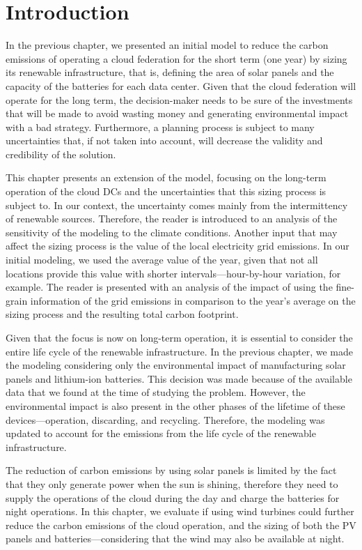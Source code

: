 \section{Introduction}

In the previous chapter, we presented an initial model to reduce the carbon emissions of operating a cloud federation for the short term (one year) by sizing its renewable infrastructure, that is, defining the area of solar panels and the capacity of the batteries for each data center. Given that the cloud federation will operate for the long term, the decision-maker needs to be sure of the investments that will be made to avoid wasting money and generating environmental impact with a bad strategy. Furthermore, a planning process is subject to many uncertainties that, if not taken into account, will decrease the validity and credibility of the solution.

This chapter presents an extension of the model, focusing on the long-term operation of the cloud DCs and the uncertainties that this sizing process is subject to. In our context, the uncertainty comes mainly from the intermittency of renewable sources. Therefore, the reader is introduced to an analysis of the sensitivity of the modeling to the climate conditions. Another input that may affect the sizing process is the value of the local electricity grid emissions. In our initial modeling, we used the average value of the year, given that not all locations provide this value with shorter intervals---hour-by-hour variation, for example. The reader is presented with an analysis of the impact of using the fine-grain information of the grid emissions in comparison to the year's average on the sizing process and the resulting total carbon footprint.

Given that the focus is now on long-term operation, it is essential to consider the entire life cycle of the renewable infrastructure. In the previous chapter, we made the modeling considering only the environmental impact of manufacturing solar panels and lithium-ion batteries. This decision was made because of the available data that we found at the time of studying the problem. However, the environmental impact is also present in the other phases of the lifetime of these devices---operation, discarding, and recycling. Therefore, the modeling was updated to account for the emissions from the life cycle of the renewable infrastructure.

The reduction of carbon emissions by using solar panels is limited by the fact that they only generate power when the sun is shining, therefore they need to supply the operations of the cloud during the day and charge the batteries for night operations. In this chapter, we evaluate if using wind turbines could further reduce the carbon emissions of the cloud operation, and the sizing of both the PV panels and batteries---considering that the wind may also be available at night.

